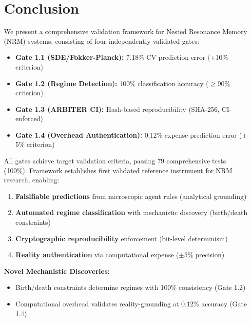 \documentclass[11pt]{article}
\begin{document}


\section{Conclusion}

We present a comprehensive validation framework for Nested Resonance Memory (NRM) systems, consisting of four independently validated gates:

\begin{itemize}
\item \textbf{Gate 1.1 (SDE/Fokker-Planck):} 7.18\% CV prediction error ($\pm$10\% criterion)
\item \textbf{Gate 1.2 (Regime Detection):} 100\% classification accuracy ($\geq$90\% criterion)
\item \textbf{Gate 1.3 (ARBITER CI):} Hash-based reproducibility (SHA-256, CI-enforced)
\item \textbf{Gate 1.4 (Overhead Authentication):} 0.12\% expense prediction error ($\pm$5\% criterion)
\end{itemize}

All gates achieve target validation criteria, passing 79 comprehensive tests (100\%). Framework establishes first validated reference instrument for NRM research, enabling:

\begin{enumerate}
\item \textbf{Falsifiable predictions} from microscopic agent rules (analytical grounding)
\item \textbf{Automated regime classification} with mechanistic discovery (birth/death constraints)
\item \textbf{Cryptographic reproducibility} enforcement (bit-level determinism)
\item \textbf{Reality authentication} via computational expense ($\pm$5\% precision)
\end{enumerate}

\textbf{Novel Mechanistic Discoveries:}
\begin{itemize}
\item Birth/death constraints determine regimes with 100\% consistency (Gate 1.2)
\item Computational overhead validates reality-grounding at 0.12\% accuracy (Gate 1.4)
\end{itemize}
\end{document}
